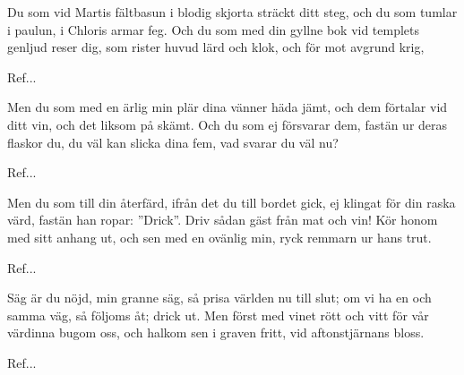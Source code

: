 \begin{SongText}
    \begin{SongVerse}
        Du som vid Martis fältbasun
        i blodig skjorta sträckt ditt steg,
        och du som tumlar i paulun,
        i Chloris armar feg.
        Och du som med din gyllne bok
        vid templets genljud reser dig,
        som rister huvud lärd och klok,
        och för mot avgrund krig,
    \end{SongVerse}
    \begin{SongVerse}
        Ref...
    \end{SongVerse}
    \begin{SongVerse}
        Men du som med en ärlig min
        plär dina vänner häda jämt,
        och dem förtalar vid ditt vin,
        och det liksom på skämt.
        Och du som ej försvarar dem,
        fastän ur deras flaskor du,
        du väl kan slicka dina fem,
        vad svarar du väl nu?
    \end{SongVerse}
    \begin{SongVerse}
        Ref...
    \end{SongVerse}
    \begin{SongVerse}
        Men du som till din återfärd,
        ifrån det du till bordet gick,
        ej klingat för din raska värd,
        fastän han ropar: ”Drick”.
        Driv sådan gäst från mat och vin!
        Kör honom med sitt anhang ut,
        och sen med en ovänlig min,
        ryck remmarn ur hans trut.
    \end{SongVerse}
    \begin{SongVerse}
        Ref...
    \end{SongVerse}
    \begin{SongVerse}
        Säg är du nöjd, min granne säg,
        så prisa världen nu till slut;
        om vi ha en och samma väg,
        så följoms åt; drick ut.
        Men först med vinet rött och vitt
        för vår värdinna bugom oss,
        och halkom sen i graven fritt,
        vid aftonstjärnans bloss.
    \end{SongVerse}
    \begin{SongVerse}
        Ref...
    \end{SongVerse}
\end{SongText}
